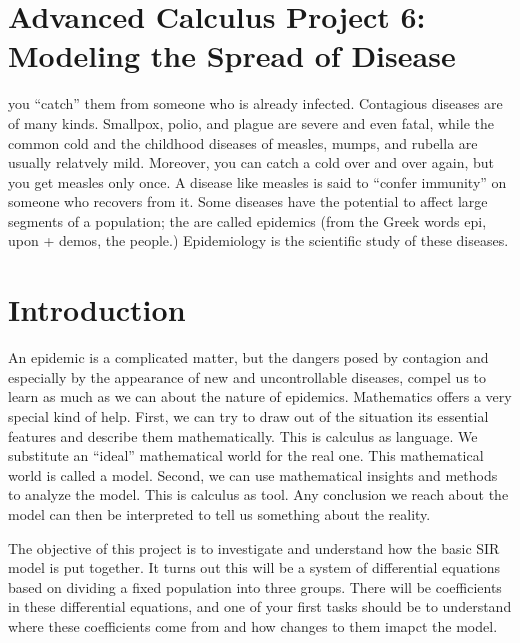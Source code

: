 \documentclass
[justified,nohyper]
{tufte-handout}
\begin{document}
\section{Advanced Calculus Project 6: Modeling the Spread of Disease}

 you ``catch'' them from someone 
who is already infected. Contagious diseases are of many kinds. Smallpox, polio, 
and plague are severe and even fatal, while the common cold and the childhood 
diseases of measles, mumps, and rubella are usually relatvely mild. Moreover, you 
can catch a cold over and over again, but you get measles only once. A disease 
like measles is said to ``confer immunity'' on someone who recovers from it. Some 
diseases have the potential to affect large segments of a population; the are 
called epidemics (from the Greek words epi, upon + demos, the people.) 
Epidemiology is the scientific study of these diseases.

\section{Introduction}

An epidemic is a complicated matter, but the dangers posed by contagion and 
especially by the appearance of new and uncontrollable diseases, compel us to 
learn as much as we can about the nature of epidemics. Mathematics offers a very 
special kind of help. First, we can try to draw out of the situation its 
essential features and describe them mathematically. This is calculus as 
language. We substitute an ``ideal'' mathematical world for the real one. This 
mathematical world is called a model. Second, we can use mathematical insights 
and methods to analyze the model. This is calculus as tool. Any conclusion we 
reach about the model can then be interpreted to tell us something about the 
reality.

The objective of this project is to investigate and understand how the basic SIR 
model is put together. It turns out this will be a system of differential 
equations based on dividing a fixed population into three groups. There will be 
coefficients in these differential equations, and one of your first tasks should 
be to understand where these coefficients come from and how changes to them 
imapct the model.

\end{document}
